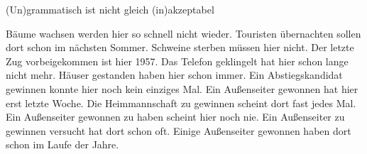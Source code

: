 \begin{frame}
  {(Un)grammatisch ist nicht gleich (in)akzeptabel}
  \pause
  \begin{exe}
    \ex\begin{xlist}
      \ex Bäume wachsen werden hier so schnell nicht wieder.
      \pause
      \ex Touristen übernachten sollen dort schon im nächsten Sommer.
      \pause
      \ex Schweine sterben müssen hier nicht.
      \pause
      \ex Der letzte Zug vorbeigekommen ist hier 1957.
      \pause
      \ex Das Telefon geklingelt hat hier schon lange nicht mehr.
      \pause
      \ex Häuser gestanden haben hier schon immer.
      \pause
      \ex Ein Abstiegskandidat gewinnen konnte hier noch kein einziges Mal.
      \pause
      \ex Ein Außenseiter gewonnen hat hier erst letzte Woche.
      \pause
      \ex Die Heimmannschaft zu gewinnen scheint dort fast jedes Mal.
      \pause
      \ex Ein Außenseiter gewonnen zu haben scheint hier noch nie.
      \pause
      \ex Ein Außenseiter zu gewinnen versucht hat dort schon oft.
      \pause
      \ex Einige Außenseiter gewonnen haben dort schon im Laufe der Jahre.
    \end{xlist}
  \end{exe}
\end{frame}




